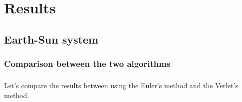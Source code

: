 \documentclass[a4paper, twoside, 11pt]{report}
\theoremstyle{theorem}
\theoremstyle{remark}
\theoremstyle{exemple}
\begin{document}
    

\chapter{Results}
    \section{Earth-Sun system}
        \subsection{Comparison between the two algorithms}
            \paragraph{}Let's compare the results between using the Euler's method and the Verlet's method.
\end{document}
